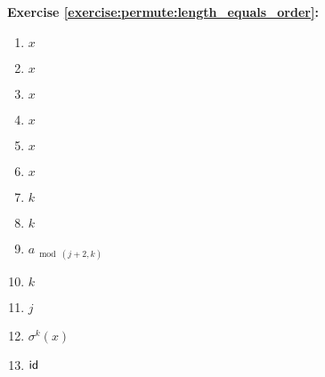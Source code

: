 \noindent\textbf{Exercise \ref{exercise:permute:length_equals_order}:}
%
\begin{multicols}{3}
\begin{enumerate}
\item
$x$

%
\item
$x$

\item
$x$

\item
$x$

\item
$x$

\item
$x$

\item
$k$

\item
$k$

\item
$a_{\bmod{(j+2,k)}}$

\item
$k$

\item
$j$

\item
%
$\sigma^k(x)$

\item
$\sf{id}$
\end{enumerate}
\end{multicols}


